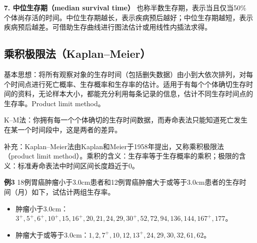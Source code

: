 \textbf{7. 中位生存期（median survival time）} 也称半数生存期，表示当且仅当50\%个体尚存活的时间。中位生存期越长，表示疾病预后越好；中位生存期越短，表示疾病预后越差。可借助生存曲线进行图法估计或用线性内插法求得。
\subsection{乘积极限法（Kaplan--Meier）}
基本思想：将所有观察对象的生存时间（包括删失数据）由小到大依次排列，对每个时间点进行死亡概率、生存概率和生存率的估计。适用于有每个个体确切生存时间的资料，无论样本大小，都能充分利用每条记录的信息，估计不同生存时间点的生存率。Product limit method。
\begin{annotation}
K--M法：你拥有每一个个体确切的生存时间数据，而寿命表法只能知道死亡发生在某一个时间段中，这是两者的差异。

补充：Kaplan--Meier法由Kaplan和Meier于1958年提出，又称乘积极限法（product limit method）。乘积的含义：生存率等于生存概率的乘积；极限的含义：标准寿命表法中时间区间长度趋近于0。
\end{annotation}
\textbf{例3} 18例胃癌肿瘤小于3.0cm患者和12例胃癌肿瘤大于或等于3.0cm患者的生存时间（月）如下，试估计两组生存率。
\begin{itemize}[before=\raggedright]
\item 肿瘤小于3.0cm：$3^+,\allowbreak 5^+,\allowbreak 6^+,\allowbreak 10^+,\allowbreak 15,\allowbreak 16^+,\allowbreak 20,\allowbreak 21,\allowbreak 24,\allowbreak 29,\allowbreak 30^+,\allowbreak 52,\allowbreak 72,\allowbreak 94,\allowbreak 136,\allowbreak 144,\allowbreak 167^+,\allowbreak 177$。
\item 肿瘤大于或等于3.0cm：$1,\allowbreak 2,\allowbreak 7^+,\allowbreak 10,\allowbreak 12,\allowbreak 13^+,\allowbreak 24,\allowbreak 29,\allowbreak 30,\allowbreak 32,\allowbreak 61,\allowbreak 62$。
\end{itemize}
